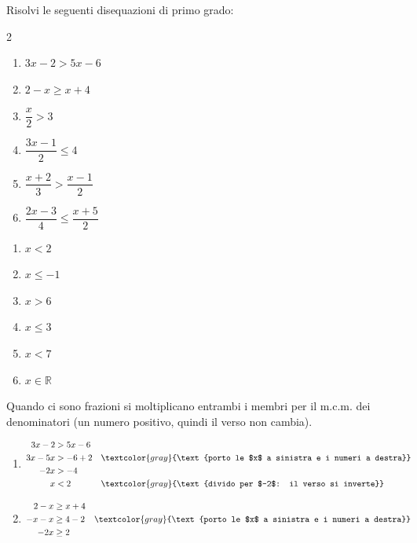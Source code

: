\begin{question}[ID=1.3, subtitle={Disequazioni di primo grado con frazioni e parentesi}, difficulty=media, tags={disequazioni lineari}]
Risolvi le seguenti disequazioni di primo grado:
\begin{multicols}{2}
\begin{enumerate}[leftmargin=3.2cm]
    \item $3x - 2 > 5x - 6$
    \item $2 - x \geq x + 4$
    \item $\dfrac{x}{2} > 3$
    \item $\dfrac{3x - 1}{2} \leq 4$
    \item $\dfrac{x + 2}{3} > \dfrac{x - 1}{2}$
    \item $\dfrac{2x - 3}{4} \leq \dfrac{x + 5}{2}$
\end{enumerate}
\end{multicols}
\begin{solution}
\begin{enumerate}
    \item $x<2$
    \item $x\leq -1$
    \item $x>6$
    \item $x\leq 3$
    \item $x<7$
    \item $x\in\mathbb{R}$
\end{enumerate}
\end{solution}
\begin{explanation}
Quando ci sono frazioni si moltiplicano entrambi i membri per il m.c.m. dei denominatori (un numero positivo, quindi il verso non cambia).
\begin{enumerate}
    \item \[\begin{aligned}
    3x-2 &> 5x-6\\
    3x-5x &> -6+2 && \textcolor{gray}{\text{porto le $x$ a sinistra e i numeri a destra}}\\
    -2x &> -4\\
    x &< 2 && \textcolor{gray}{\text{divido per $-2$: il verso si inverte}}
    \end{aligned}\]
    \item \[\begin{aligned}
    2-x &\geq x+4\\
    -x-x &\geq 4-2 && \textcolor{gray}{\text{porto le $x$ a sinistra e i numeri a destra}}\\
    -2x &\geq 2\\

\end{aligned}\]
\end{enumerate}
\end{explanation}
\end{question}
